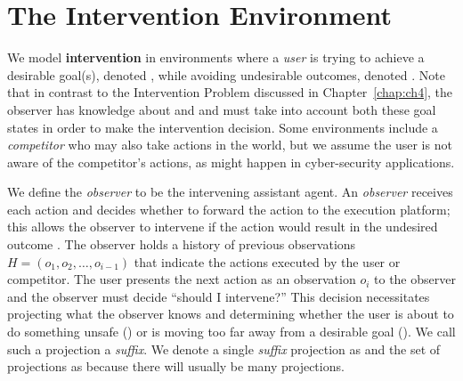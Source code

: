 \section{The Intervention Environment}
\label{sec:distinguishing}
We model {\bf intervention} in environments where a \textit{user} is trying to achieve a desirable goal(s), denoted \desired, while avoiding undesirable outcomes, denoted \undesired.
Note that in contrast to the Intervention Problem discussed in Chapter~\ref{chap:ch4}, the observer has knowledge about \desired and \undesired and must take into account both these goal states in order to make the intervention decision.
Some environments include a \textit{competitor} who may also take actions in the world, but we assume the user is not aware of the competitor's actions, as might happen in cyber-security applications.

We define the \textit{observer} to be the intervening assistant agent. 
An \textit{observer} receives each action and decides whether to forward the action to the execution platform;
this allows the observer to intervene if the action would result in the undesired outcome \undesired.  
The observer holds a history of previous observations $H = (o_1, o_2, \ldots, o_{i-1})$ that indicate the actions executed by the user or competitor.
The user presents the next action as an observation $o_{i}$ to the observer and the observer must decide ``should I intervene?''
This decision necessitates projecting what the observer knows and determining whether the user is about to do something unsafe (\undesired) 
or is moving too far away from a desirable goal (\desired).
We call such a projection a \textit{suffix}.
We denote a single  \textit{suffix} projection as \Suffix and the set of projections as \Suffixes because there will usually be many projections.

